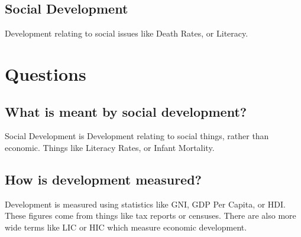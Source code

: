 \documentclass[11pt, oneside]{article}   	%
\begin{document}
\subsection{Social Development}
Development relating to social issues like Death Rates, or Literacy.


\section{Questions}
\subsection{What is meant by social development?}
Social Development is Development relating to social things, rather than economic. Things like Literacy Rates, or Infant Mortality.


\subsection{How is development measured?}
Development is measured using statistics like GNI, GDP Per Capita, or HDI. These figures come from things like tax reports or censuses. There are also more wide terms like LIC or HIC which measure economic development.
\end{document}
